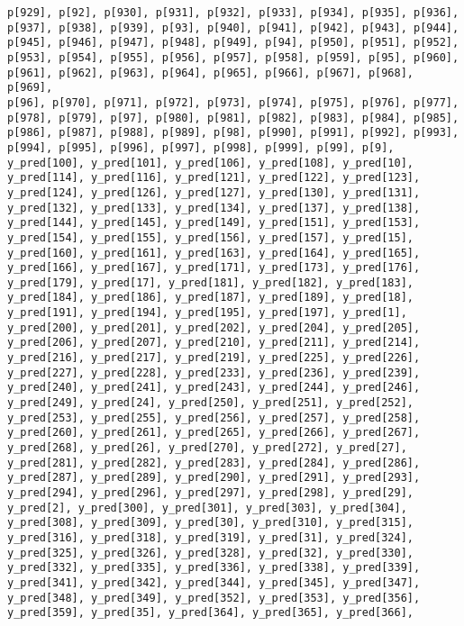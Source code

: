 \documentclass[
  letterpaper,
  DIV=11,
  numbers=noendperiod]{scrartcl}
\begin{document}
\begin{verbatim}
p[929], p[92], p[930], p[931], p[932], p[933], p[934], p[935], p[936],
p[937], p[938], p[939], p[93], p[940], p[941], p[942], p[943], p[944],
p[945], p[946], p[947], p[948], p[949], p[94], p[950], p[951], p[952],
p[953], p[954], p[955], p[956], p[957], p[958], p[959], p[95], p[960],
p[961], p[962], p[963], p[964], p[965], p[966], p[967], p[968], p[969],
p[96], p[970], p[971], p[972], p[973], p[974], p[975], p[976], p[977],
p[978], p[979], p[97], p[980], p[981], p[982], p[983], p[984], p[985],
p[986], p[987], p[988], p[989], p[98], p[990], p[991], p[992], p[993],
p[994], p[995], p[996], p[997], p[998], p[999], p[99], p[9],
y_pred[100], y_pred[101], y_pred[106], y_pred[108], y_pred[10],
y_pred[114], y_pred[116], y_pred[121], y_pred[122], y_pred[123],
y_pred[124], y_pred[126], y_pred[127], y_pred[130], y_pred[131],
y_pred[132], y_pred[133], y_pred[134], y_pred[137], y_pred[138],
y_pred[144], y_pred[145], y_pred[149], y_pred[151], y_pred[153],
y_pred[154], y_pred[155], y_pred[156], y_pred[157], y_pred[15],
y_pred[160], y_pred[161], y_pred[163], y_pred[164], y_pred[165],
y_pred[166], y_pred[167], y_pred[171], y_pred[173], y_pred[176],
y_pred[179], y_pred[17], y_pred[181], y_pred[182], y_pred[183],
y_pred[184], y_pred[186], y_pred[187], y_pred[189], y_pred[18],
y_pred[191], y_pred[194], y_pred[195], y_pred[197], y_pred[1],
y_pred[200], y_pred[201], y_pred[202], y_pred[204], y_pred[205],
y_pred[206], y_pred[207], y_pred[210], y_pred[211], y_pred[214],
y_pred[216], y_pred[217], y_pred[219], y_pred[225], y_pred[226],
y_pred[227], y_pred[228], y_pred[233], y_pred[236], y_pred[239],
y_pred[240], y_pred[241], y_pred[243], y_pred[244], y_pred[246],
y_pred[249], y_pred[24], y_pred[250], y_pred[251], y_pred[252],
y_pred[253], y_pred[255], y_pred[256], y_pred[257], y_pred[258],
y_pred[260], y_pred[261], y_pred[265], y_pred[266], y_pred[267],
y_pred[268], y_pred[26], y_pred[270], y_pred[272], y_pred[27],
y_pred[281], y_pred[282], y_pred[283], y_pred[284], y_pred[286],
y_pred[287], y_pred[289], y_pred[290], y_pred[291], y_pred[293],
y_pred[294], y_pred[296], y_pred[297], y_pred[298], y_pred[29],
y_pred[2], y_pred[300], y_pred[301], y_pred[303], y_pred[304],
y_pred[308], y_pred[309], y_pred[30], y_pred[310], y_pred[315],
y_pred[316], y_pred[318], y_pred[319], y_pred[31], y_pred[324],
y_pred[325], y_pred[326], y_pred[328], y_pred[32], y_pred[330],
y_pred[332], y_pred[335], y_pred[336], y_pred[338], y_pred[339],
y_pred[341], y_pred[342], y_pred[344], y_pred[345], y_pred[347],
y_pred[348], y_pred[349], y_pred[352], y_pred[353], y_pred[356],
y_pred[359], y_pred[35], y_pred[364], y_pred[365], y_pred[366],

\end{verbatim}
\end{document}
